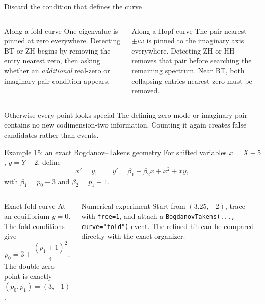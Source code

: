 \begin{frame}{Discard the condition that defines the curve}
\small
\begin{columns}[T,onlytextwidth]
\begin{block}{Along a fold curve}
One eigenvalue is pinned at zero everywhere. Detecting BT or ZH begins by
removing the entry nearest zero, then asking whether an \emph{additional}
real-zero or imaginary-pair condition appears.
\end{block}
\begin{block}{Along a Hopf curve}
The pair nearest $\pm i\omega$ is pinned to the imaginary axis everywhere.
Detecting ZH or HH removes that pair before searching the remaining spectrum.
Near BT, both collapsing entries nearest zero must be removed.
\end{block}
\end{columns}
\vspace{4mm}
\begin{alertblock}{Otherwise every point looks special}
The defining zero mode or imaginary pair contains no new codimension-two
information. Counting it again creates false candidates rather than events.
\end{alertblock}
\end{frame}

\begin{frame}{Example 15: an exact Bogdanov--Takens geometry}
\small
For shifted variables $x=X-5$, $y=Y-2$, define
\[
x'=y,\qquad
y'=\beta_1+\beta_2x+x^2+xy,
\]
with $\beta_1=p_0-3$ and $\beta_2=p_1+1$.
\begin{columns}[T,onlytextwidth]
\begin{block}{Exact fold curve}
At an equilibrium $y=0$. The fold conditions give
\[
p_0=3+\frac{(p_1+1)^2}{4}.
\]
The double-zero point is exactly $(p_0,p_1)=(3,-1)$.
\end{block}
\begin{block}{Numerical experiment}
Start from $(3.25,-2)$, trace with \texttt{free=1}, and attach a
\texttt{BogdanovTakens(..., curve="fold")} event. The refined hit can be
compared directly with the exact organizer.
\end{block}
\end{columns}
\end{frame}

